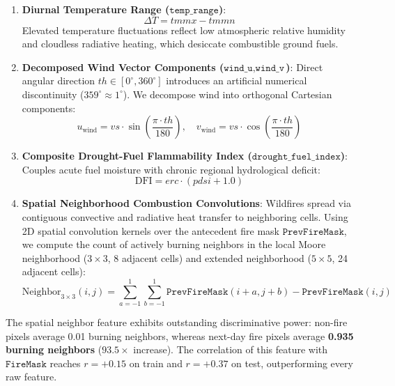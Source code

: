 \documentclass[10pt,journal,compsoc]{IEEEtran}
\begin{document}
\begin{enumerate}
    \item \textbf{Diurnal Temperature Range ($\texttt{temp\_range}$)}:
    \begin{equation}
        \Delta T = tmmx - tmmn
    \end{equation}
    Elevated temperature fluctuations reflect low atmospheric relative humidity and cloudless radiative heating, which desiccate combustible ground fuels.
    
    \item \textbf{Decomposed Wind Vector Components ($\texttt{wind\_u}, \texttt{wind\_v}$)}:
    Direct angular direction $th \in [0^\circ, 360^\circ]$ introduces an artificial numerical discontinuity ($359^\circ \approx 1^\circ$). We decompose wind into orthogonal Cartesian components:
    \begin{equation}
        u_{\text{wind}} = vs \cdot \sin\left(\frac{\pi \cdot th}{180}\right), \quad v_{\text{wind}} = vs \cdot \cos\left(\frac{\pi \cdot th}{180}\right)
    \end{equation}
    
    \item \textbf{Composite Drought-Fuel Flammability Index ($\texttt{drought\_fuel\_index}$)}:
    Couples acute fuel moisture with chronic regional hydrological deficit:
    \begin{equation}
        \text{DFI} = erc \cdot (pdsi + 1.0)
    \end{equation}
    
    \item \textbf{Spatial Neighborhood Combustion Convolutions}:
    Wildfires spread via contiguous convective and radiative heat transfer to neighboring cells. Using 2D spatial convolution kernels over the antecedent fire mask $\texttt{PrevFireMask}$, we compute the count of actively burning neighbors in the local Moore neighborhood ($3 \times 3$, 8 adjacent cells) and extended neighborhood ($5 \times 5$, 24 adjacent cells):
    \begin{equation}
        \text{Neighbor}_{3\times 3}(i, j) = \sum_{a=-1}^{1} \sum_{b=-1}^{1} \texttt{PrevFireMask}(i+a, j+b) - \texttt{PrevFireMask}(i, j)
    \end{equation}
\end{enumerate}

The spatial neighbor feature exhibits outstanding discriminative power: non-fire pixels average 0.01 burning neighbors, whereas next-day fire pixels average \textbf{0.935 burning neighbors} ($93.5\times$ increase). The correlation of this feature with $\texttt{FireMask}$ reaches $r = +0.15$ on train and $r = +0.37$ on test, outperforming every raw feature.
\end{document}

